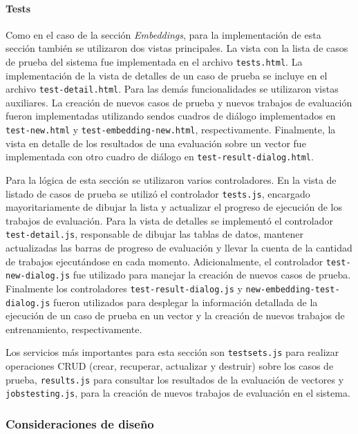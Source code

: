\paragraph{Tests}

Como en el caso de la sección \textit{Embeddings}, para la implementación de esta sección también se
utilizaron dos vistas principales. La vista con la lista de casos de prueba del sistema fue implementada en
el archivo \texttt{tests.html}. La implementación de la vista de detalles de un caso de prueba se incluye
en el archivo \texttt{test-detail.html}. Para las demás funcionalidades se utilizaron vistas auxiliares. La
creación de nuevos casos de prueba y nuevos trabajos de evaluación fueron implementadas utilizando sendos
cuadros de diálogo implementados en \texttt{test-new.html} y \texttt{test-embedding-new.html},
respectivamente. Finalmente, la vista en detalle de los resultados de una evaluación sobre un vector fue
implementada con otro cuadro de diálogo en \texttt{test-result-dialog.html}.

Para la lógica de esta sección se utilizaron varios controladores. En la vista de listado de casos de
prueba se utilizó el controlador \texttt{tests.js}, encargado mayoritariamente de dibujar la lista y
actualizar el progreso de ejecución de los trabajos de evaluación. Para la vista de detalles se implementó
el controlador \texttt{test-detail.js}, responsable de dibujar las tablas de datos, mantener actualizadas
las barras de progreso de evaluación y llevar la cuenta de la cantidad de trabajos ejecutándose en cada
momento. Adicionalmente, el controlador \texttt{test-new-dialog.js} fue utilizado para manejar la creación
de nuevos casos de prueba. Finalmente los controladores \texttt{test-result-dialog.js} y
\texttt{new-embedding-test-dialog.js} fueron utilizados para desplegar la información detallada de la
ejecución de un caso de prueba en un vector y la creación de nuevos trabajos de entrenamiento,
respectivamente.

Los servicios más importantes para esta sección son \texttt{testsets.js} para realizar operaciones
CRUD (crear, recuperar, actualizar y destruir) sobre los casos de prueba, \texttt{results.js} para
consultar los resultados de la evaluación de vectores y \texttt{jobstesting.js}, para la creación de nuevos
trabajos de evaluación en el sistema.

\subsubsection{Consideraciones de diseño}

